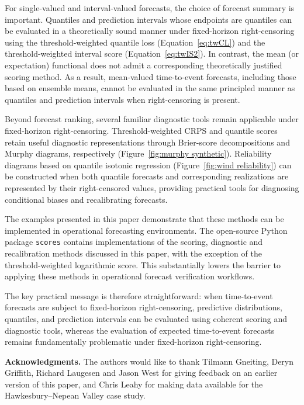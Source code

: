 \documentclass[10pt]{article} %
\theoremstyle{theorem}
\theoremstyle{definition}
\begin{document}
For single-valued and interval-valued forecasts, the choice of forecast summary is important. Quantiles and prediction intervals whose endpoints are quantiles can be evaluated in a theoretically sound manner under fixed-horizon right-censoring using the threshold-weighted quantile loss (Equation~\ref{eq:twCL}) and the threshold-weighted interval score (Equation~\ref{eq:twIS2}). In contrast, the mean (or expectation) functional does not admit a corresponding theoretically justified scoring method. As a result, mean-valued time-to-event forecasts, including those based on ensemble means, cannot be evaluated in the same principled manner as quantiles and prediction intervals when right-censoring is present.

Beyond forecast ranking, several familiar diagnostic tools remain applicable under fixed-horizon right-censoring. Threshold-weighted CRPS and quantile scores retain useful diagnostic representations through Brier-score decompositions and Murphy diagrams, respectively (Figure~\ref{fig:murphy synthetic}). Reliability diagrams based on quantile isotonic regression (Figure~\ref{fig:wind reliability}) can be constructed when both quantile forecasts and corresponding realizations are represented by their right-censored values, providing practical tools for diagnosing conditional biases and recalibrating forecasts.

The examples presented in this paper demonstrate that these methods can be implemented in operational forecasting environments. The open-source Python package \texttt{scores} \citep{leeuwenburg2025scores, leeuwenburg2024scores} contains implementations of the scoring, diagnostic and recalibration methods discussed in this paper, with the exception of the threshold-weighted logarithmic score. This substantially lowers the barrier to applying these methods in operational forecast verification workflows.

The key practical message is therefore straightforward: when time-to-event forecasts are subject to fixed-horizon right-censoring, predictive distributions, quantiles, and prediction intervals can be evaluated using coherent scoring and diagnostic tools, whereas the evaluation of expected time-to-event forecasts remains fundamentally problematic under fixed-horizon right-censoring.


\vspace{10pt}

\noindent\textbf{Acknowledgments.} The authors would like to thank Tilmann Gneiting, Deryn Griffith, Richard Laugesen and Jason West for giving feedback on an earlier version of this paper, and Chris Leahy for making data available for the Hawkesbury--Nepean Valley case study.
\end{document}
